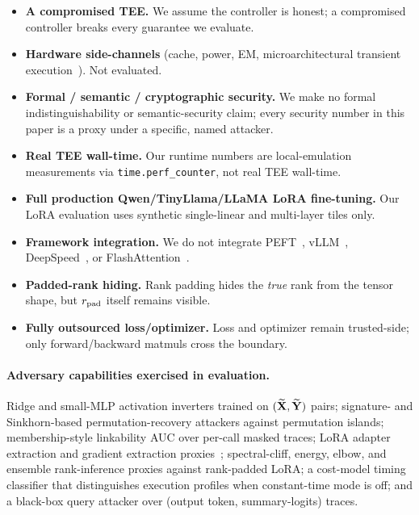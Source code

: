 \begin{itemize}[leftmargin=*, nosep]
  \item \textbf{A compromised TEE.} We assume the controller is honest; a compromised controller breaks every guarantee we evaluate.
  \item \textbf{Hardware side-channels} (cache, power, EM, microarchitectural transient execution~\cite{kocher2019spectre, vanbulck2018foreshadow}). Not evaluated.
  \item \textbf{Formal / semantic / cryptographic security.} We make no formal indistinguishability or semantic-security claim; every security number in this paper is a proxy under a specific, named attacker.
  \item \textbf{Real TEE wall-time.} Our runtime numbers are local-emulation measurements via \texttt{time.perf\_counter}, not real TEE wall-time.
  \item \textbf{Full production Qwen/TinyLlama/LLaMA LoRA fine-tuning.} Our LoRA evaluation uses synthetic single-linear and multi-layer tiles only.
  \item \textbf{Framework integration.} We do not integrate PEFT~\cite{peft2022}, vLLM~\cite{kwon2023vllm}, DeepSpeed~\cite{rasley2020deepspeed}, or FlashAttention~\cite{dao2022flashattention}.
  \item \textbf{Padded-rank hiding.} Rank padding hides the \emph{true} rank from the tensor shape, but $r_{\mathrm{pad}}$ itself remains visible.
  \item \textbf{Fully outsourced loss/optimizer.} Loss and optimizer remain trusted-side; only forward/backward matmuls cross the boundary.
\end{itemize}

\paragraph{Adversary capabilities exercised in evaluation.}
Ridge and small-MLP activation inverters trained on $(\widetilde{\mathbf{X}}, \widetilde{\mathbf{Y}})$ pairs; signature- and Sinkhorn-based permutation-recovery attackers against permutation islands; membership-style linkability AUC over per-call masked traces; LoRA adapter extraction and gradient extraction proxies~\cite{zhu2019dlg, zhao2020idlg}; spectral-cliff, energy, elbow, and ensemble rank-inference proxies against rank-padded LoRA; a cost-model timing classifier that distinguishes execution profiles when constant-time mode is off; and a black-box query attacker over (output token, summary-logits) traces.

